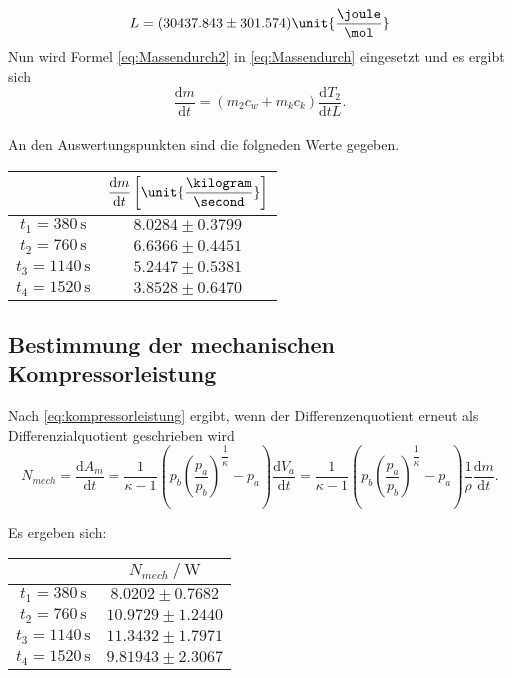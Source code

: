 \begin{equation}
  L = (30437.843 \pm 301.574) \unit{\dfrac{\joule}{\mol}}
\end{equation}
Nun wird Formel \eqref{eq:Massendurch2} in \eqref{eq:Massendurch} eingesetzt und es ergibt sich
\begin{equation}
  \dfrac{\text{d}m}{\text{d}t} = (m_2c_w +m_kc_k)\dfrac{\text{d}T_2}{\text{d}tL}.
\end{equation}
\\
An den Auswertungspunkten sind die folgneden Werte gegeben.
\begin{table}[H]
  \centering
  \begin{tabular}{S S}
    \toprule
    & {$\dfrac{\text{d}m}{\text{d}t}  \left[\unit{\dfrac{\kilogram}{\second}}\right]$}  \\
    \midrule
    {$t_1 = 380  \, \unit{\second}$} & {$8.0284 \pm 0.3799$}  \\
    {$t_2 = 760  \, \unit{\second}$} & {$6.6366 \pm 0.4451$}  \\
    {$t_3 = 1140 \, \unit{\second}$} & {$5.2447 \pm 0.5381$}  \\
    {$t_4 = 1520 \, \unit{\second}$} & {$3.8528 \pm 0.6470$}  \\
    \bottomrule
  \end{tabular}
\end{table}

\subsection{Bestimmung der mechanischen Kompressorleistung}

Nach \eqref{eq:kompressorleistung} ergibt, wenn der Differenzenquotient erneut als Differenzialquotient geschrieben wird
\begin{equation}
N_{mech}= \dfrac{\text{d}A_m}{\text{d}t} = \dfrac{1}{κ-1} \left(p_b\left(\dfrac{p_a}{p_b}\right)^{\dfrac{1}{κ}}-p_a\right) \dfrac{\text{d}V_a}{\text{d}t} = 
    \dfrac{1}{κ-1} \left (p_b \left(\dfrac{p_a}{p_b} \right)^{\dfrac{1}{κ}}-p_a \right) \dfrac{1}{ρ}\dfrac{\text{d}m}{\text{d}t}.
\end{equation}

Es ergeben sich:

\begin{table}[H]
  \centering
  \label{tab:kompressorleistung}
  \begin{tabular}{S S}
    \toprule
    & {$N_{mech} \mathbin{/} \unit{\watt}$} \\
    \midrule
    {$t_1 = 380  \, \unit{\second}$} & {$ 8.0202 \pm 0.7682$} \\
    {$t_2 = 760  \, \unit{\second}$} & {$10.9729 \pm 1.2440$} \\
    {$t_3 = 1140 \, \unit{\second}$} & {$11.3432 \pm 1.7971$} \\
    {$t_4 = 1520 \, \unit{\second}$} & {$9.81943 \pm 2.3067$} \\
    \bottomrule
  \end{tabular}
\end{table}

